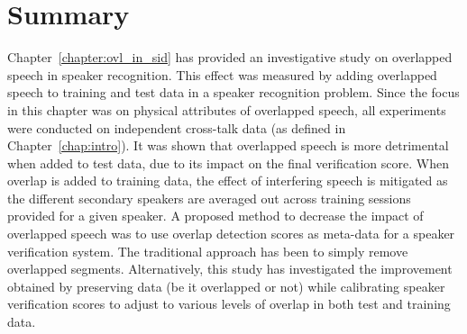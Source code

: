 \section{Summary}
\label{sec:ch3_summary}
Chapter~\ref{chapter:ovl_in_sid} has provided an investigative study on overlapped speech in speaker recognition. 
This effect was measured by adding overlapped speech to training and test data in a speaker recognition problem. 
Since the focus in this chapter was on physical attributes of overlapped speech, all experiments were conducted on independent cross-talk data (as defined in Chapter~\ref{chap:intro}). 
It was shown that overlapped speech is more detrimental when added to test data, due to its impact on the final verification score. 
When overlap is added to training data, the effect of interfering speech is mitigated as the different secondary speakers are averaged out across training sessions provided for a given speaker. 
A proposed method to decrease the impact of overlapped speech was to use overlap detection scores as meta-data for a speaker verification system. 
The traditional approach has been to simply remove overlapped segments. 
Alternatively, this study has investigated the improvement obtained by preserving data (be it overlapped or not) while calibrating speaker verification scores to adjust to various levels of overlap in both test and training data. 
